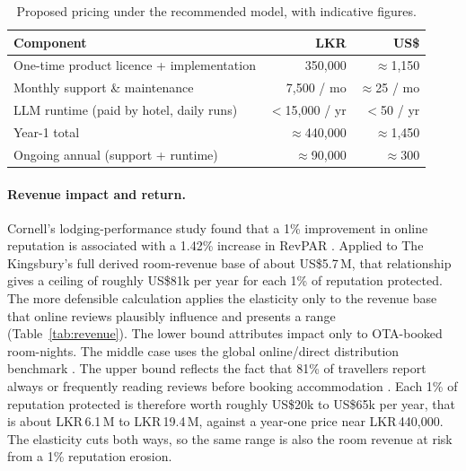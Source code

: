 \documentclass[11pt,a4paper]{article}
\begin{document}
\begin{table}[H]
\centering
\caption{Proposed pricing under the recommended model, with indicative figures.}
\label{tab:cost}
\begin{tabularx}{\linewidth}{Xrr}
\toprule
\textbf{Component} & \textbf{LKR} & \textbf{US\$} \\
\midrule
One-time product licence + implementation & 350{,}000 & $\approx$1{,}150 \\
Monthly support \& maintenance & 7{,}500 / mo & $\approx$25 / mo \\
LLM runtime (paid by hotel, daily runs) & $<$15{,}000 / yr & $<$50 / yr \\
\midrule
Year-1 total & $\approx$440{,}000 & $\approx$1{,}450 \\
Ongoing annual (support + runtime) & $\approx$90{,}000 & $\approx$300 \\
\bottomrule
\end{tabularx}
\end{table}

\paragraph{Revenue impact and return.} Cornell's lodging-performance study found that a 1\% improvement
in online reputation is associated with a 1.42\% increase in RevPAR \citep{anderson2012social}. Applied
to The Kingsbury's full derived room-revenue base of about US\$5.7\,M, that relationship gives a ceiling
of roughly US\$81k per year for each 1\% of reputation protected. The more defensible calculation applies
the elasticity only to the revenue base that online reviews plausibly influence and presents a range
(Table~\ref{tab:revenue}). The lower bound attributes impact only to OTA-booked room-nights. The middle
case uses the global online/direct distribution benchmark \citep{skift2024ota}. The upper bound reflects
the fact that 81\% of travellers report always or frequently reading reviews before booking
accommodation \citep{tripadvisor2019reviews}. Each 1\% of reputation protected is therefore worth roughly
US\$20k to US\$65k per year, that is about LKR\,6.1\,M to LKR\,19.4\,M, against a year-one price near
LKR\,440{,}000. The elasticity cuts both ways, so the same range is also the room revenue at risk from a
1\% reputation erosion.
\end{document}
